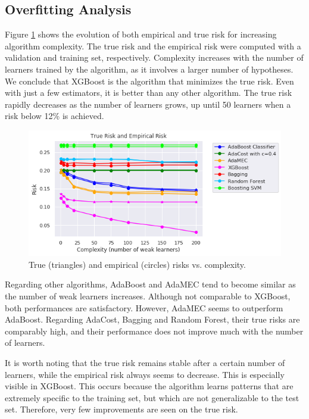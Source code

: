 \documentclass[conference]{IEEEtran}
\begin{document}
\subsection{Overfitting Analysis}

Figure \ref{fig:True_empirical_risk_complexity} shows the evolution of both empirical and true risk for increasing algorithm complexity. The true risk and the empirical risk were computed with a validation and training set, respectively. Complexity increases with the number of learners trained by the algorithm, as it involves a larger number of hypotheses. We conclude that XGBoost is the algorithm that minimizes the true risk. Even with just a few estimators, it is better than any other algorithm. The true risk rapidly decreases as the number of learners grows, up until 50 learners when a risk below 12\% is achieved.

\begin{figure}
	\includegraphics[scale=0.45]{True_empirical_risk_complexity}
	\centering
	\caption{True (triangles) and empirical (circles) risks vs. complexity.}
	\label{fig:True_empirical_risk_complexity}
\end{figure}

Regarding other algorithms, AdaBoost and AdaMEC tend to become similar as the number of weak learners increases. Although not comparable to XGBoost, both performances are satisfactory. However, AdaMEC seems to outperform AdaBoost. Regarding AdaCost, Bagging and Random Forest, their true risks are comparably high, and their performance does not improve much with the number of learners.

It is worth noting that the true risk remains stable after a certain number of learners, while the empirical risk always seems to decrease. This is especially visible in XGBoost. This occurs because the algorithm learns patterns that are extremely specific to the training set, but which are not generalizable to the test set. Therefore, very few improvements are seen on the true risk. %
\end{document}
